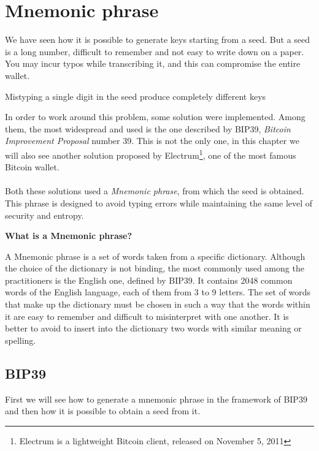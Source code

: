 
\chapter{Mnemonic phrase} %

\label{mnemonic} %


We have seen how it is possible to generate keys starting from a seed. But a seed is a long number, difficult to remember and not easy to write down on a paper. You may incur typos while transcribing it, and this can compromise the entire wallet.
\begin{remark}
	Mistyping a single digit in the seed produce completely different keys
\end{remark}
In order to work around this problem, some solution were implemented. Among them, the most widespread and used is the one described by BIP39, \textit{Bitcoin Improvement Proposal} number 39. This is not the only one, in this chapter we will also see another solution proposed by Electrum\footnote{Electrum is a lightweight Bitcoin client, released on November 5, 2011}, one of the most famous Bitcoin wallet.
\\ \\
Both these solutions used a \textit{Mnemonic phrase}, from which the seed is obtained. This phrase is designed to avoid typing errors while maintaining the same level of security and entropy.
\begin{flushleft}
	\textbf{What is a Mnemonic phrase?}
\end{flushleft}
A Mnemonic phrase is a set of words taken from a specific dictionary. Although the choice of the dictionary is not binding, the most commonly used among the practitioners is the English one, defined by BIP39. It contains 2048 common words of the English language, each of them from 3 to 9 letters. The set of words that make up the dictionary must be chosen in such a way that the words within it are easy to remember and difficult to misinterpret with one another. It is better to avoid to insert into the dictionary two words with similar meaning or spelling.

\section{BIP39}
First we will see how to generate a mnemonic phrase in the framework of BIP39 and then how it is possible to obtain a seed from it.


